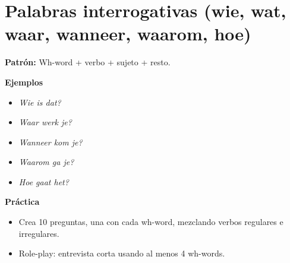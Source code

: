 \section{Palabras interrogativas (wie, wat, waar, wanneer, waarom, hoe)}
\textbf{Patrón:} Wh-word + verbo + sujeto + resto.

\textbf{Ejemplos}
\begin{itemize}[leftmargin=*]
  \item \textit{Wie is dat?}
  \item \textit{Waar werk je?}
  \item \textit{Wanneer kom je?}
  \item \textit{Waarom ga je?}
  \item \textit{Hoe gaat het?}
\end{itemize}

\textbf{Práctica}
\begin{itemize}[leftmargin=*]
  \item Crea 10 preguntas, una con cada wh-word, mezclando verbos regulares e irregulares.
  \item Role-play: entrevista corta usando al menos 4 wh-words.
\end{itemize}
